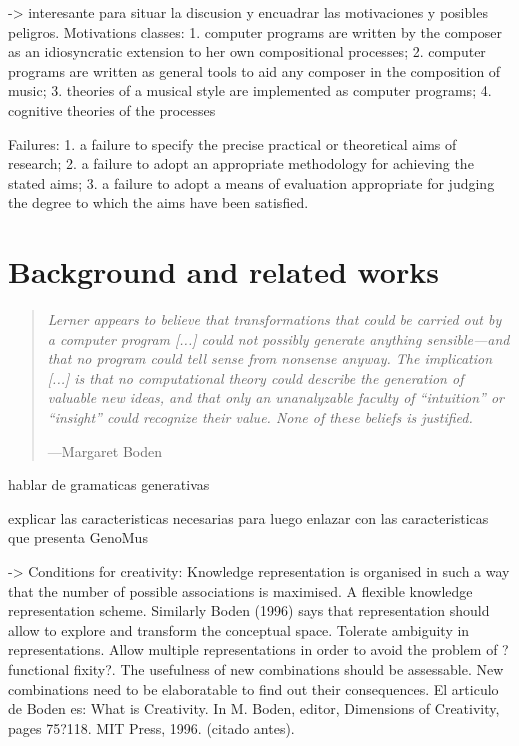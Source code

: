 \documentclass{article}
\begin{document}
{\color{red} 



\cite{Pearce2002} -> interesante para situar la discusion y encuadrar las motivaciones y posibles peligros.
Motivations classes:
1. computer programs are written by the composer as an idiosyncratic extension
to her own compositional processes;
2. computer programs are written as general tools to aid any composer in the
composition of music;
3. theories of a musical style are implemented as computer programs;
4. cognitive theories of the processes

Failures:
1. a failure to specify the precise practical or theoretical aims of research;
2. a failure to adopt an appropriate methodology for achieving the stated aims;
3. a failure to adopt a means of evaluation appropriate for judging the degree to
which the aims have been satisfied.



}

\section{Background and related works}

\begin{samepage}
\begin{quotation}
\textsl{Lerner appears to believe that transformations that could be carried
out by a computer program [...] could not possibly generate anything sensible---and that no program could tell sense from nonsense anyway. The implication [...] is that no computational theory could describe the generation of valuable new ideas, and that only an unanalyzable faculty of ``intuition'' or ``insight'' could recognize their value. None of these beliefs is justified.}

---Margaret Boden \cite{BodenWhatIsCr}
\end{quotation}
\end{samepage}


hablar de gramaticas generativas

explicar las caracteristicas necesarias para luego enlazar con las caracteristicas que presenta GenoMus

\cite{DBLP:journals/air/RoweP93} -> Conditions for creativity:
Knowledge representation is organised in such a
way that the number of possible associations is
maximised. A flexible knowledge representation
scheme. Similarly Boden (1996) says that representation
should allow to explore and transform the
conceptual space.
Tolerate ambiguity in representations.
Allow multiple representations in order to avoid the
problem of ?functional fixity?.
The usefulness of new combinations should be assessable.
New combinations need to be elaboratable to find
out their consequences.
El articulo de Boden es: 
What is Creativity. In M. Boden, editor, Dimensions of Creativity, pages 75?118. MIT Press, 1996. (citado antes).
\end{document}
